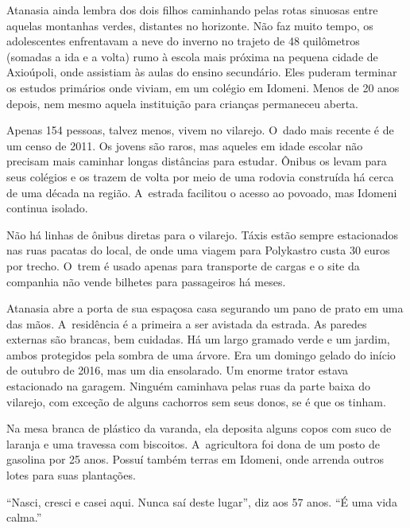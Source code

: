 \putodd{}
\clearpage

 

Atanasia ainda lembra dos dois filhos caminhando pelas rotas sinuosas
entre aquelas montanhas verdes, distantes no horizonte. Não faz muito
tempo, os adolescentes enfrentavam a neve do inverno no trajeto de
48 quilômetros (somadas a ida e a volta) rumo à escola mais próxima na
pequena cidade de Axioúpoli, onde assistiam às aulas do ensino
secundário. Eles puderam terminar os estudos primários onde viviam, em
um colégio em Idomeni. Menos de 20 anos depois, nem mesmo aquela
instituição para crianças permaneceu aberta.

Apenas 154 pessoas, talvez menos, vivem no vilarejo. O~dado mais recente
é de um censo de 2011. Os jovens são raros, mas aqueles em idade escolar
não precisam mais caminhar longas distâncias para estudar. Ônibus os
levam para seus colégios e os trazem de volta por meio de uma rodovia
construída há cerca de uma década na região. A~estrada facilitou o
acesso ao povoado, mas Idomeni continua isolado.

Não há linhas de ônibus diretas para o vilarejo. Táxis estão sempre
estacionados nas ruas pacatas do local, de onde uma viagem para
Polykastro custa 30 euros por trecho. O~trem é usado apenas para
transporte de cargas e o site da companhia não vende bilhetes para
passageiros há meses.

Atanasia abre a porta de sua espaçosa casa segurando um pano de prato em
uma das mãos. A~residência é a primeira a ser avistada da estrada. As
paredes externas são brancas, bem cuidadas. Há um largo gramado verde e
um jardim, ambos protegidos pela sombra de uma árvore. Era um domingo
gelado do início de outubro de 2016, mas um dia ensolarado. Um enorme
trator estava estacionado na garagem. Ninguém caminhava pelas ruas da
parte baixa do vilarejo, com exceção de alguns cachorros sem seus
donos, se é que os tinham.

Na mesa branca de plástico da varanda, ela deposita alguns copos com
suco de laranja e uma travessa com biscoitos. A~agricultora foi dona de
um posto de gasolina por 25 anos. Possuí também terras em Idomeni, onde
arrenda outros lotes para suas plantações.

``Nasci, cresci e casei aqui. Nunca saí deste lugar'', diz aos 57 anos.
``É uma vida calma.''

